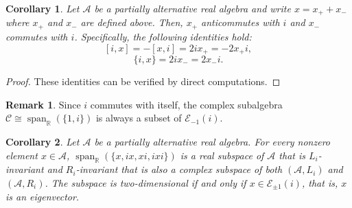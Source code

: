 \documentclass{amsart}
\theoremstyle{definition}
\newtheorem{remark}{Remark}
\theoremstyle{plain}
\newtheorem{corollary}{Corollary}
\begin{document}
\begin{corollary}
Let $\mathcal{A}$ be a partially alternative real algebra and write $x=x_+ +x_-$ where $x_+$ and $x_-$ are defined above. Then, $x_+$ anticommutes with $i$ and $x_-$ commutes with $i$. Specifically, the following identities hold:
$$[i,x]=-[x,i]=2ix_+=-2x_+i,$$
$$\{i,x\}=2ix_-=2x_-i.$$
\end{corollary}
\begin{proof}
These identities can be verified by direct computations.
\end{proof}
\begin{remark}
Since $i$ commutes with  itself,  the complex subalgebra $\mathcal C\cong\operatorname{span}_{\mathbb{R}}(\{1,i\})$ is always a subset of $\mathcal{E}_{-1}(i)$.
\end{remark}
\begin{corollary}
Let $\mathcal{A}$ be a partially alternative real algebra. For every nonzero element $x\in\mathcal{A}$, $\operatorname{span}_{\mathbb R}(\{x,ix,xi,ixi\})$ is a real subspace of $\mathcal{A}$ that is $L_i$-invariant and $R_i$-invariant that is also a complex subspace of both $(\mathcal{A},L_i)$ and $(\mathcal{A}, R_i)$. 
The subspace is two-dimensional if and only if $x\in\mathcal{E}_{\pm1}(i)$, that is, $x$ is an eigenvector.
\end{corollary}
\end{document}
